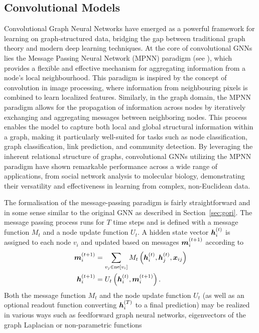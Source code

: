 \subsection{Convolutional Models}

Convolutional Graph Neural Networks have emerged as a powerful framework for learning on graph-structured data, bridging the gap between traditional graph theory and modern deep learning techniques. At the core of convolutional GNNs lies the Message Passing Neural Network (MPNN) paradigm (see \cite{gilmer_neural_2017}), which provides a flexible and effective mechanism for aggregating information from a node's local neighbourhood. This paradigm is inspired by the concept of convolution in image processing, where information from neighbouring pixels is combined to learn localized features. Similarly, in the graph domain, the MPNN paradigm allows for the propagation of information across nodes by iteratively exchanging and aggregating messages between neighboring nodes. This process enables the model to capture both local and global structural information within a graph, making it particularly well-suited for tasks such as node classification, graph classification, link prediction, and community detection. By leveraging the inherent relational structure of graphs, convolutional GNNs utilizing the MPNN paradigm have shown remarkable performance across a wide range of applications, from social network analysis to molecular biology, demonstrating their versatility and effectiveness in learning from complex, non-Euclidean data.

The formalisation of the message-passing paradigm is fairly straightforward and in some sense similar to the original GNN as described in Section~\ref{sec:gori}. The message passing process runs for \( T \) time steps and is defined with a message function \( M_t \) and a node update function \( U_t \). A hidden state vector \( \bm{h}_i^{(t)} \) is assigned to each node \( v_i \) and updated based on messages \( \bm{m}_i^{(t+1)} \) according to
\begin{equation}\label{eq:message-passing}
	\begin{split}
		\bm{m}_i^{(t+1)} &= \sum_{v_j \in \mathrm{ne}[v_i]} M_t \left( \bm{h}_i^{(t)}, \bm{h}_j^{(t)}, \bm{x}_{ij} \right) \\
		\bm{h}_i^{(t+1)} &= U_t \left( \bm{h}_i^{(t)}, \bm{m}_i^{(t+1)} \right). \\
	\end{split}
\end{equation}
Both the message function \( M_t \) and the node update function \( U_t \) (as well as an optional readout function converting \( \bm{h}_i^{(T)} \) to a final prediction) may be realized in various ways such as feedforward graph neural networks, eigenvectors of the graph Laplacian or non-parametric functions

